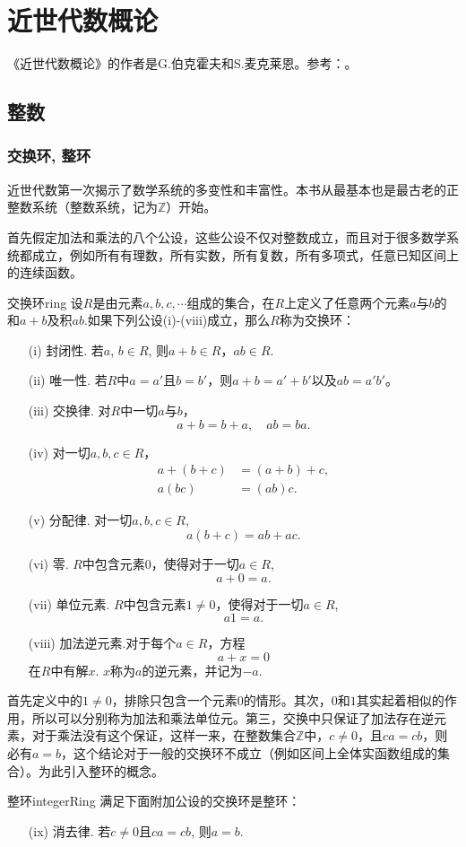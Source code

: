 \chapter{近世代数概论}
《近世代数概论》的作者是G.伯克霍夫和S.麦克莱恩。参考：\cite{surveyofmodernalgebra1979}。

\section{整数}\label{section001}
\subsection{交换环, 整环}
近世代数第一次揭示了数学系统的多变性和丰富性。本书从最基本也是最古老的正整数系统（整数系统，记为$\mathbb{Z}$）开始。

首先假定加法和乘法的八个公设，这些公设不仅对整数成立，而且对于很多数学系统都成立，例如所有有理数，所有实数，所有复数，所有多项式，任意已知区间上的连续函数。

\begin{definition}{交换环}{ring} 
设$R$是由元素$a,b,c,\cdots$组成的集合，在$R$上定义了任意两个元素$a$与$b$的和$a+b$及积$ab$.如果下列公设(i)-(viii)成立，那么$R$称为交换环：
\begin{enumerate}
\item[(i)] 封闭性. 若$a$, $b \in R$, 则$a+b \in R$，$ab \in R$.
\item[(ii)] 唯一性. 若$R$中$a=a'$且$b=b'$，则$a+b=a'+b'$以及$ab=a'b'$。
\item[(iii)]交换律. 对$R$中一切$a$与$b$，
\[
a+b=b+a,\quad ab=ba.
\]
\item[(iv)]对一切$a,b,c \in R$，
\[
\begin{aligned}
a + (b + c) &= (a+b)+c, \\
a(bc) &= (ab)c.
\end{aligned}
\]
\item[(v)]分配律. 对一切$a,b,c \in R$,
\[
a(b + c)=ab + ac. 
\]
\item[(vi)]零. $R$中包含元素$0$，使得对于一切$a \in R$, 
\[
a + 0 = a.
\]
\item[(vii)]单位元素. $R$中包含元素$1 \neq 0$，使得对于一切$a \in R$,
\[
a1=a.
\]
\item[(viii)]加法逆元素.对于每个$a \in R$，方程
\[
a + x = 0
\]
在$R$中有解$x$. $x$称为$a$的逆元素，并记为$-a$.
\end{enumerate}
\end{definition}

首先定义中的$1 \neq 0$，排除只包含一个元素$0$的情形。其次，$0$和$1$其实起着相似的作用，所以可以分别称为加法和乘法单位元。第三，交换中只保证了加法存在逆元素，对于乘法没有这个保证，这样一来，在整数集合$\mathbb{Z}$中，$c \neq 0$，且$ca=cb$，则必有$a=b$，这个结论对于一般的交换环不成立（例如区间上全体实函数组成的集合）。为此引入整环的概念。
\begin{definition}{整环}{integerRing} 
满足下面附加公设的交换环是整环：
\begin{enumerate}
\item[(ix)] 消去律. 若$c \neq 0$且$ca=cb$, 则$a=b$.
\end{enumerate}
\end{definition}

